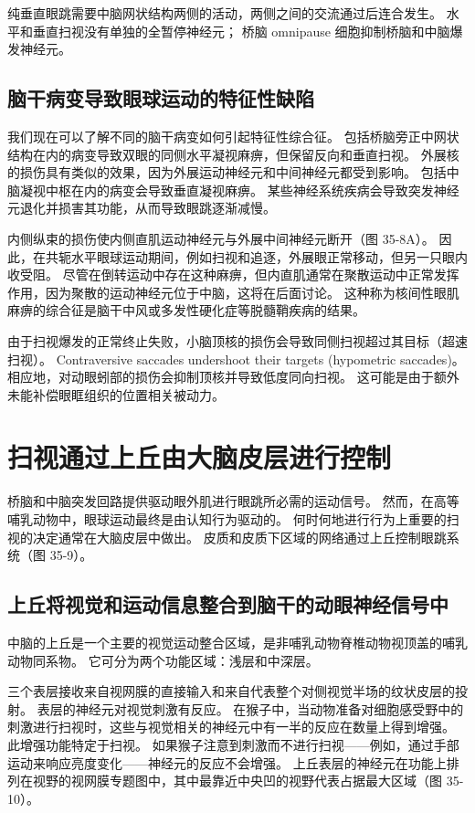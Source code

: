 纯垂直眼跳需要中脑网状结构两侧的活动，两侧之间的交流通过后连合发生。 水平和垂直扫视没有单独的全暂停神经元； 桥脑 omnipause 细胞抑制桥脑和中脑爆发神经元。

\subsection{脑干病变导致眼球运动的特征性缺陷}
我们现在可以了解不同的脑干病变如何引起特征性综合征。 包括桥脑旁正中网状结构在内的病变导致双眼的同侧水平凝视麻痹，但保留反向和垂直扫视。 外展核的损伤具有类似的效果，因为外展运动神经元和中间神经元都受到影响。 包括中脑凝视中枢在内的病变会导致垂直凝视麻痹。 某些神经系统疾病会导致突发神经元退化并损害其功能，从而导致眼跳逐渐减慢。

内侧纵束的损伤使内侧直肌运动神经元与外展中间神经元断开（图 35-8A）。 因此，在共轭水平眼球运动期间，例如扫视和追逐，外展眼正常移动，但另一只眼内收受阻。 尽管在倒转运动中存在这种麻痹，但内直肌通常在聚散运动中正常发挥作用，因为聚散的运动神经元位于中脑，这将在后面讨论。 这种称为核间性眼肌麻痹的综合征是脑干中风或多发性硬化症等脱髓鞘疾病的结果。

由于扫视爆发的正常终止失败，小脑顶核的损伤会导致同侧扫视超过其目标（超速扫视）。 Contraversive saccades undershoot their targets (hypometric saccades)。 相应地，对动眼蚓部的损伤会抑制顶核并导致低度同向扫视。 这可能是由于额外未能补偿眼眶组织的位置相关被动力。


\section{扫视通过上丘由大脑皮层进行控制}
桥脑和中脑突发回路提供驱动眼外肌进行眼跳所必需的运动信号。 然而，在高等哺乳动物中，眼球运动最终是由认知行为驱动的。 何时何地进行行为上重要的扫视的决定通常在大脑皮层中做出。 皮质和皮质下区域的网络通过上丘控制眼跳系统（图 35-9）。

\subsection{上丘将视觉和运动信息整合到脑干的动眼神经信号中}
中脑的上丘是一个主要的视觉运动整合区域，是非哺乳动物脊椎动物视顶盖的哺乳动物同系物。 它可分为两个功能区域：浅层和中深层。

三个表层接收来自视网膜的直接输入和来自代表整个对侧视觉半场的纹状皮层的投射。 表层的神经元对视觉刺激有反应。 在猴子中，当动物准备对细胞感受野中的刺激进行扫视时，这些与视觉相关的神经元中有一半的反应在数量上得到增强。 此增强功能特定于扫视。 如果猴子注意到刺激而不进行扫视——例如，通过手部运动来响应亮度变化——神经元的反应不会增强。 上丘表层的神经元在功能上排列在视野的视网膜专题图中，其中最靠近中央凹的视野代表占据最大区域（图 35-10）。

